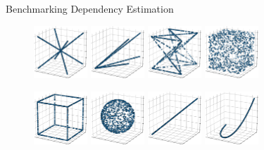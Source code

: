 \documentclass[16pt,usenames,dvipsnames, notheorems]{beamer}
\theoremstyle{definition}
\theoremstyle{example}
\theoremstyle{plain}
\begin{document}
\begin{frame}{Benchmarking Dependency Estimation}

\begin{figure}
	{\includegraphics[width=0.18\textwidth]{figures/Cross-3-00-crop-compressed.pdf}}
	\hfill
	{\includegraphics[width=0.18\textwidth]{figures/DoubleLinear_025-3-00-crop-compressed.pdf}}
	\hfill
	{\includegraphics[width=0.18\textwidth]{figures/Hourglass-3-00-crop-compressed.pdf}}
	\hfill
	{\includegraphics[width=0.18\textwidth]{figures/Hypercube-3-00-crop-compressed.pdf}}
	
	{\includegraphics[width=0.18\textwidth]{figures/Hollowcube-3-00-crop-compressed.pdf}}
	\hfill
	{\includegraphics[width=0.18\textwidth]{figures/Sphere-3-00-crop-compressed.pdf}} 
	\hfill
	{\includegraphics[width=0.18\textwidth]{figures/Linear-3-00-crop-compressed.pdf}}
	\hfill
	{\includegraphics[width=0.18\textwidth]{figures/EvenPower_1-3-00-crop-compressed.pdf}}
	

\end{figure}
\end{frame}
\end{document}
